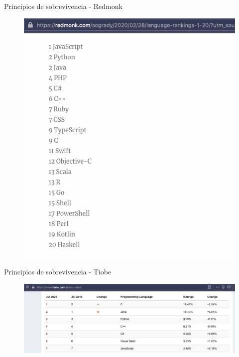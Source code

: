 \documentclass[aspectratio=169]{beamer}
\begin{document}
\begin{frame}{Principios de sobrevivencia - Redmonk}
	\begin{figure}
		\centering
		\includegraphics[width=0.9\linewidth]{Images/redmonk}
	\end{figure}
\end{frame}

\begin{frame}{Principios de sobrevivencia - Tiobe}
	\begin{figure}
		\centering
		\includegraphics[width=0.9\linewidth]{Images/tiobe}
	\end{figure}
\end{frame}
\end{document}
